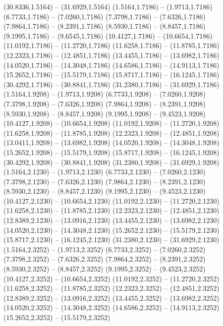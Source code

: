 {\begin{scope}[shift={(#1,#2)}]
    (30.8336,1.5164) -- (31.6929,1.5164)
    (1.5164,1.7186) -- (1.9713,1.7186)
    (6.7733,1.7186) -- (7.0260,1.7186)
    (7.3798,1.7186) -- (7.6326,1.7186)
    (7.9864,1.7186) -- (8.2391,1.7186)
    (8.5930,1.7186) -- (8.8457,1.7186)
    (9.1995,1.7186) -- (9.6545,1.7186)
    (10.4127,1.7186) -- (10.6654,1.7186)
    (11.0192,1.7186) -- (11.2720,1.7186)
    (11.6258,1.7186) -- (11.8785,1.7186)
    (12.2323,1.7186) -- (12.4851,1.7186)
    (13.4455,1.7186) -- (13.6982,1.7186)
    (14.0520,1.7186) -- (14.3048,1.7186)
    (14.6586,1.7186) -- (14.9113,1.7186)
    (15.2652,1.7186) -- (15.5179,1.7186)
    (15.8717,1.7186) -- (16.1245,1.7186)
    (30.4292,1.7186) -- (30.8841,1.7186)
    (31.2380,1.7186) -- (31.6929,1.7186)
    (1.5164,1.9208) -- (1.9713,1.9208)
    (6.7733,1.9208) -- (7.0260,1.9208)
    (7.3798,1.9208) -- (7.6326,1.9208)
    (7.9864,1.9208) -- (8.2391,1.9208)
    (8.5930,1.9208) -- (8.8457,1.9208)
    (9.1995,1.9208) -- (9.4523,1.9208)
    (10.4127,1.9208) -- (10.6654,1.9208)
    (11.0192,1.9208) -- (11.2720,1.9208)
    (11.6258,1.9208) -- (11.8785,1.9208)
    (12.2323,1.9208) -- (12.4851,1.9208)
    (13.0411,1.9208) -- (13.6982,1.9208)
    (14.0520,1.9208) -- (14.3048,1.9208)
    (15.2652,1.9208) -- (15.5179,1.9208)
    (15.8717,1.9208) -- (16.1245,1.9208)
    (30.4292,1.9208) -- (30.8841,1.9208)
    (31.2380,1.9208) -- (31.6929,1.9208)
    (1.5164,2.1230) -- (1.9713,2.1230)
    (6.7733,2.1230) -- (7.0260,2.1230)
    (7.3798,2.1230) -- (7.6326,2.1230)
    (7.9864,2.1230) -- (8.2391,2.1230)
    (8.5930,2.1230) -- (8.8457,2.1230)
    (9.1995,2.1230) -- (9.4523,2.1230)
    (10.4127,2.1230) -- (10.6654,2.1230)
    (11.0192,2.1230) -- (11.2720,2.1230)
    (11.6258,2.1230) -- (11.8785,2.1230)
    (12.2323,2.1230) -- (12.4851,2.1230)
    (12.8389,2.1230) -- (13.0916,2.1230)
    (13.4455,2.1230) -- (13.6982,2.1230)
    (14.0520,2.1230) -- (14.3048,2.1230)
    (15.2652,2.1230) -- (15.5179,2.1230)
    (15.8717,2.1230) -- (16.1245,2.1230)
    (31.2380,2.1230) -- (31.6929,2.1230)
    (1.5164,2.3252) -- (1.9713,2.3252)
    (6.7733,2.3252) -- (7.0260,2.3252)
    (7.3798,2.3252) -- (7.6326,2.3252)
    (7.9864,2.3252) -- (8.2391,2.3252)
    (8.5930,2.3252) -- (8.8457,2.3252)
    (9.1995,2.3252) -- (9.4523,2.3252)
    (10.4127,2.3252) -- (10.6654,2.3252)
    (11.0192,2.3252) -- (11.2720,2.3252)
    (11.6258,2.3252) -- (11.8785,2.3252)
    (12.2323,2.3252) -- (12.4851,2.3252)
    (12.8389,2.3252) -- (13.0916,2.3252)
    (13.4455,2.3252) -- (13.6982,2.3252)
    (14.0520,2.3252) -- (14.3048,2.3252)
    (14.6586,2.3252) -- (14.9113,2.3252)
    (15.2652,2.3252) -- (15.5179,2.3252)

\end{scope}}
